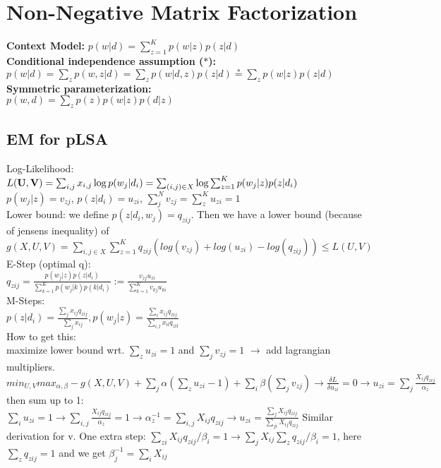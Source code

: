 \section{Non-Negative Matrix Factorization}
\textbf{Context Model:} $p(w | d) = \sum_{z=1}^K p(w | z) p(z | d)$\\
\textbf{Conditional independence assumption ($*$):}\\
$p(w|d) = \sum_z p(w,z|d) = \sum_z p(w|d,z)p(z|d) \stackrel{*}{=} \sum_z p(w|z)p(z|d)$\\
\textbf{Symmetric parameterization:}\\
$p(w, d) = \sum_z p(z)p(w | z) p(d | z)$

\subsection*{EM for pLSA}
Log-Likelihood: $L(\mathbf{U}, \mathbf{V}) = \sum_{i,j} x_{i,j}\log p(w_j|d_i) \\
= \sum_{(i,j) \in X} \log \sum_{z=1}^K p(w_j|z)p(z|d_i)$ \\ 
$ p(w_j|z) = v_{zj}$, $p(z|d_i) = u_{zi}$, $\sum_j^N v_{zj} = \sum_z^K u_{zi} = 1$\\
Lower bound: we define $p(z|d_i,w_j) = q_{zij}$. Then we have a lower bound (because of jensens inequality) of $g(X,U,V) =  \sum_{i,j \in X}  \sum_{z=1}^K q_{zij}( log(v_{zj})+ log(u_{zi}) - log(q_{zij})) \leq L(U,V)$ \\
E-Step (optimal q):\\
$q_{zij} = \frac{p(w_j|z)p(z|d_i)}{\sum_{k=1}^K p(w_j|k)p(k|d_i)} := \frac{v_{zj}u_{zi}}{\sum_{k=1}^K v_{kj}u_{ki}}$\\
M-Steps:\\
$p(z|d_i) = \frac{\sum_j x_{ij}q_{zij}}{\sum_j x_{ij}}, p(w_j|z) = \frac{\sum_i x_{ij}q_{zij}}{\sum_{i,l}x_{il}q_{zil}}$\\
How to get this: \\
maximize lower bound wrt. $\sum_z u_{zi} = 1$ and $\sum_j v_{zj}=1$ $\rightarrow$ add lagrangian multipliers. $min_{U,V}max_{\alpha,\beta}-g(X,U,V)+\sum_j \alpha (\sum_z u_{zi}-1)+ \sum_i \beta(\sum_j v_{zj}) \rightarrow \frac{\delta L}{\delta u_{zi}} = 0 \rightarrow u_{zi} = \sum_j \frac{X_{ij}q_{zij}}{\alpha_z}$ then sum up to 1: $\sum_i u_{zi} = 1 \rightarrow \sum_{i,j}\frac{X_{ij}q_{zij}}{\alpha_z}= 1 \rightarrow \alpha_z^{-1} = \sum_{i,j} X_{ij}q_{zij} \rightarrow u_{zi} = \frac{\sum_j X_{ij}q_{zij}}{\sum_{ji}X_{ij}q_{zij}}$ Similar derivation for v. One extra step: $\sum_{zi}X_{ij}q_{zij}/\beta_i = 1 \rightarrow \sum_j X_{ij} \sum_z q_{zij} / \beta_i = 1$, here $\sum_z q_{zij} = 1$ and we get $\beta_j^{-1} = \sum_i X_{ij}$

